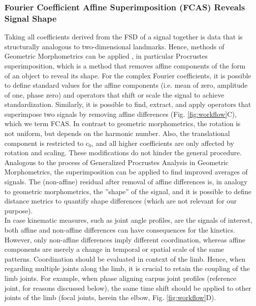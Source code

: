 \documentclass[10pt, a4paper]{article}
\begin{document}
\subsubsection{Fourier Coefficient Affine Superimposition (FCAS) Reveals Signal Shape}
Taking all coefficients derived from the FSD of a signal together is data that is structurally analogous to two-dimensional landmarks. 
Hence, methods of Geometric Morphometrics can be applied \citep{Bookstein1991,Kendall1989,Gower1975,Dryden2016}, in particular Procrustes superimposition, which is a method that removes affine components of the form of an object to reveal its shape. 
For the complex Fourier coefficients, it is possible to define standard values for the affine components (i.e. mean of zero, amplitude of one, phase zero) and operators that shift or scale the signal to achieve standardization. 
Similarly, it is possible to find, extract, and apply operators that superimpose two signals by removing affine differences (Fig. \ref{fig:workflow}C), which we term FCAS. 
In contrast to geometric morphometrics, the rotation is not uniform, but depends on the harmonic number. 
Also, the translational component is restricted to $c_{0}$, and all higher coefficients are only affected by rotation and scaling. 
These modifications do not hinder the general procedure. 
Analogous to the process of Generalized Procrustes Analysis in Geometric Morphometrics, the superimposition can be applied to find improved averages of signals. 
The (non-affine) residual after removal of affine differences is, in analogy to geometric morphometrics, the ''shape'' of the signal, and it is possible to define distance metrics to quantify shape differences (which are not relevant for our purpose). 
\\In case kinematic measures, such as joint angle profiles, are the signals of interest, both affine and non-affine differences can have consequences for the kinetics. 
However, only non-affine differences imply different coordination, whereas affine components are merely a change in temporal or spatial scale of the same patterns. 
Coordination should be evaluated in context of the limb. 
Hence, when regarding multiple joints along the limb, it is crucial to retain the coupling of the limb joints. 
For example, when phase aligning carpus joint profiles (reference joint, for reasons discussed below), the same time shift should be applied to other joints of the limb (focal joints, herein the elbow, Fig. \ref{fig:workflow}D). 
\end{document}
